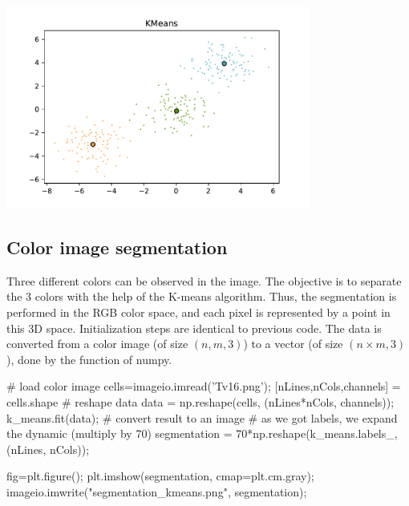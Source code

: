\centerline{\includegraphics[width=10cm]{kmeans.pdf}}

\subsection{Color image segmentation}
Three different colors can be observed in the image. The objective is to separate the 3 colors with the help of the K-means algorithm. Thus, the segmentation is performed in the RGB color space, and each pixel is represented by a point in this 3D space.
Initialization steps are identical to previous code. The data is converted from a color image (of size $(n,m,3)$) to a vector (of size $(n\times m, 3)$), done by the  function of numpy. 

\begin{python}
# load color image
cells=imageio.imread('Tv16.png');
[nLines,nCols,channels] = cells.shape
# reshape data
data = np.reshape(cells, (nLines*nCols, channels));
k_means.fit(data);
# convert result to an image
# as we got labels, we expand the dynamic (multiply by 70)
segmentation = 70*np.reshape(k_means.labels_, (nLines, nCols));

fig=plt.figure();
plt.imshow(segmentation, cmap=plt.cm.gray);
imageio.imwrite("segmentation_kmeans.png", segmentation);
\end{python}


